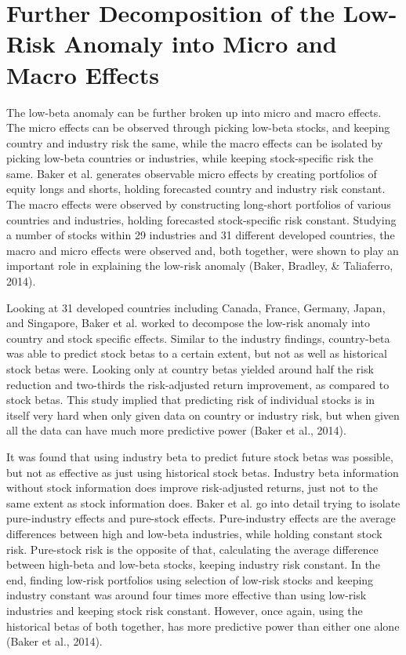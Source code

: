 \documentclass[12pt,twoside]{reedthesis}
\theoremstyle{definition}
\theoremstyle{definition}
\theoremstyle{definition}
\theoremstyle{remark}
\begin{document}
\section{Further Decomposition of the Low-Risk Anomaly into Micro and
Macro
Effects}\label{further-decomposition-of-the-low-risk-anomaly-into-micro-and-macro-effects}

The low-beta anomaly can be further broken up into micro and macro
effects. The micro effects can be observed through picking low-beta
stocks, and keeping country and industry risk the same, while the macro
effects can be isolated by picking low-beta countries or industries,
while keeping stock-specific risk the same. Baker et al. generates
observable micro effects by creating portfolios of equity longs and
shorts, holding forecasted country and industry risk constant. The macro
effects were observed by constructing long-short portfolios of various
countries and industries, holding forecasted stock-specific risk
constant. Studying a number of stocks within 29 industries and 31
different developed countries, the macro and micro effects were observed
and, both together, were shown to play an important role in explaining
the low-risk anomaly (Baker, Bradley, \& Taliaferro, 2014).

Looking at 31 developed countries including Canada, France, Germany,
Japan, and Singapore, Baker et al. worked to decompose the low-risk
anomaly into country and stock specific effects. Similar to the industry
findings, country-beta was able to predict stock betas to a certain
extent, but not as well as historical stock betas were. Looking only at
country betas yielded around half the risk reduction and two-thirds the
risk-adjusted return improvement, as compared to stock betas. This study
implied that predicting risk of individual stocks is in itself very hard
when only given data on country or industry risk, but when given all the
data can have much more predictive power (Baker et al., 2014).

It was found that using industry beta to predict future stock betas was
possible, but not as effective as just using historical stock betas.
Industry beta information without stock information does improve
risk-adjusted returns, just not to the same extent as stock information
does. Baker et al. go into detail trying to isolate pure-industry
effects and pure-stock effects. Pure-industry effects are the average
differences between high and low-beta industries, while holding constant
stock risk. Pure-stock risk is the opposite of that, calculating the
average difference between high-beta and low-beta stocks, keeping
industry risk constant. In the end, finding low-risk portfolios using
selection of low-risk stocks and keeping industry constant was around
four times more effective than using low-risk industries and keeping
stock risk constant. However, once again, using the historical betas of
both together, has more predictive power than either one alone (Baker et
al., 2014).
\end{document}
